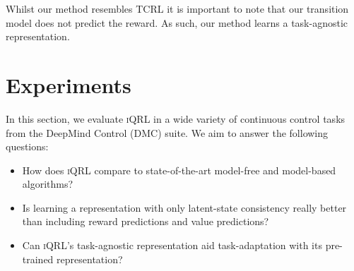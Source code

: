 \documentclass{article}
\theoremstyle{plain}
\theoremstyle{definition}
\theoremstyle{remark}
\newcommand{\our}{\textsc{iQRL}\xspace}
\begin{document}
Whilst our method resembles TCRL \citep{zhaoSimplifiedTemporalConsistency2023} it is important to note that
our transition model does not predict the reward.
As such, our method learns a task-agnostic representation.


\section{Experiments}
\label{sec:experiments}
In this section, we evaluate \our in a wide variety of continuous control tasks from the DeepMind Control (DMC) suite.
We aim to answer the following questions:
\begin{itemize}
    \item How does \our compare to state-of-the-art model-free and model-based algorithms?
    \item Is learning a representation with only latent-state consistency really better than including reward predictions and value predictions?
    \item Can \our's task-agnostic representation aid task-adaptation with its pre-trained representation?
\end{itemize}


\end{document}
